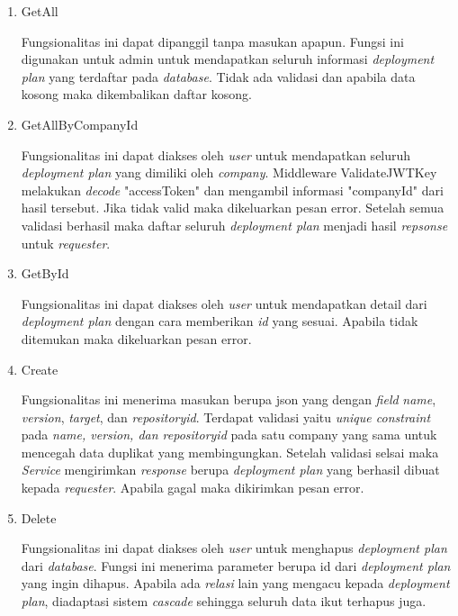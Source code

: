 \begin{enumerate}
  \item GetAll

        Fungsionalitas ini dapat dipanggil tanpa masukan apapun. Fungsi ini digunakan untuk admin untuk mendapatkan seluruh informasi \textit{deployment plan} yang terdaftar pada \textit{database}. Tidak ada validasi dan apabila data kosong maka dikembalikan daftar kosong.

  \item GetAllByCompanyId

        Fungsionalitas ini dapat diakses oleh \textit{user} untuk mendapatkan seluruh \textit{deployment plan} yang dimiliki oleh \textit{company}. Middleware ValidateJWTKey melakukan \textit{decode} "accessToken" dan mengambil informasi "companyId" dari hasil tersebut. Jika tidak valid maka dikeluarkan pesan error. Setelah semua validasi berhasil maka daftar seluruh \textit{deployment plan} menjadi hasil \textit{repsonse} untuk \textit{requester}.

  \item GetById

        Fungsionalitas ini dapat diakses oleh \textit{user} untuk mendapatkan detail dari \textit{deployment plan} dengan cara memberikan \textit{id} yang sesuai. Apabila tidak ditemukan maka dikeluarkan pesan error.

  \item Create

        Fungsionalitas ini menerima masukan berupa json yang dengan \textit{field} \textit{name}, \textit{version}, \textit{target}, dan \textit{repository\textunderscore id}. Terdapat validasi yaitu \textit{unique constraint} pada \textit{name, version, dan repository\textunderscore id} pada satu company yang sama untuk mencegah data duplikat yang membingungkan. Setelah validasi selsai maka \textit{Service} mengirimkan \textit{response} berupa \textit{deployment plan} yang berhasil dibuat kepada \textit{requester}. Apabila gagal maka dikirimkan pesan error.

  \item Delete

        Fungsionalitas ini dapat diakses oleh \textit{user} untuk menghapus \textit{deployment plan} dari \textit{database}. Fungsi ini menerima parameter berupa id dari \textit{deployment plan} yang ingin dihapus. Apabila ada \textit{relasi} lain yang mengacu kepada \textit{deployment plan}, diadaptasi sistem \textit{cascade} sehingga seluruh data ikut terhapus juga.


\end{enumerate}
